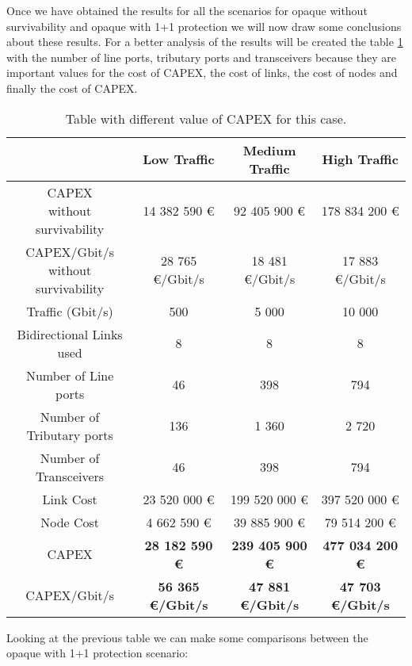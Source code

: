 Once we have obtained the results for all the scenarios for opaque without survivability and opaque with 1+1 protection we will now draw some conclusions about these results. For a better analysis of the results will be created the table \ref{table_comparative_opaque_protec_heuristic} with the number of line ports, tributary ports and transceivers because they are important values for the cost of CAPEX, the cost of links, the cost of nodes and finally the cost of CAPEX.\\

\begin{table}[H]
\centering
\begin{tabular}{| c | c | c | c |}
 \hline
 & Low Traffic & Medium Traffic & High Traffic \\
 \hline\hline
 \makecell{CAPEX \\ without survivability} & 14 382 590 \euro & 92 405 900 \euro & 178 834 200 \euro \\ \hline
 \makecell{CAPEX/Gbit/s \\ without survivability} & 28 765 \euro/Gbit/s & 18 481 \euro/Gbit/s & 17 883 \euro/Gbit/s \\ \hline
 Traffic (Gbit/s) & 500 & 5 000 & 10 000 \\ \hline
 Bidirectional Links used & 8 & 8 & 8 \\ \hline
 Number of Line ports & 46 & 398 & 794 \\ \hline
 Number of Tributary ports & 136 & 1 360 & 2 720 \\ \hline
 Number of Transceivers & 46 & 398 & 794 \\ \hline
 Link Cost & 23 520 000 \euro & 199 520 000 \euro & 397 520 000 \euro \\ \hline
 Node Cost & 4 662 590 \euro & 39 885 900 \euro & 79 514 200 \euro \\ \hline
 CAPEX & \textbf{28 182 590 \euro} & \textbf{239 405 900 \euro} & \textbf{477 034 200 \euro} \\ \hline
 CAPEX/Gbit/s & \textbf{56 365 \euro/Gbit/s} & \textbf{47 881 \euro/Gbit/s} & \textbf{47 703 \euro/Gbit/s} \\ \hline
\end{tabular}
\caption{Table with different value of CAPEX for this case.}
\label{table_comparative_opaque_protec_heuristic}
\end{table}

Looking at the previous table we can make some comparisons between the opaque with 1+1 protection scenario:

